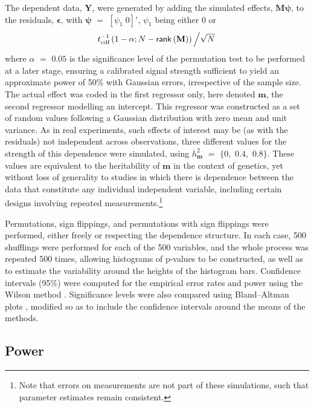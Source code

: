 The dependent data, $\mathbf{Y}$, were generated by adding the simulated effects, $\mathbf{M}\boldsymbol{\psi}$, to the residuals, $\boldsymbol{\epsilon}$, with $\boldsymbol{\psi}$ $=$ $[\psi_1 \; 0]'$, $\psi_1$ being either 0 or
$$t^{-1}_{\text{cdf}}\left(1-\alpha ; N-\mathsf{rank}\left(\mathbf{M}\right)\right)\left/\sqrt{N}\right.$$
where $\alpha$ $=$ $0.05$ is the significance level of the permutation test to be performed at a later stage, ensuring a calibrated signal strength sufficient to yield an approximate power of 50\% with Gaussian errors, irrespective of the sample size. The actual effect was coded in the first regressor only, here denoted $\mathbf{m}$, the second regressor modelling an intercept. This regressor was constructed as a set of random values following a Gaussian distribution with zero mean and unit variance. As in real experiments, such effects of interest may be (as with the residuals) not independent across observations, three different values for the strength of this dependence were simulated, using $h_{\mathbf{m}}^{2}$ $=$ $\{0,$ $0.4,$ $0.8\}$. These values are equivalent to the heritability of $\mathbf{m}$ in the context of genetics, yet without loss of generality to studies in which there is dependence between the data that constitute any individual independent variable, including certain designs involving repeated measurements.\footnote{Note that errors on measurements are not part of these simulations, such that parameter estimates remain consistent.}

Permutations, sign flippings, and permutations with sign flippings were performed, either freely or respecting the dependence structure. In each case, 500 shufflings were performed for each of the 500 variables, and the whole process was repeated 500 times, allowing histograms of p-values to be constructed, as well as to estimate the variability around the heights of the histogram bars. Confidence intervals (95\%) were computed for the empirical error rates and power using the Wilson method \citep{Wilson1927}. Significance levels were also compared using Bland--Altman plots \citep{Bland1986}, modified so as to include the confidence intervals around the means of the methods.

\subsection{Power}

